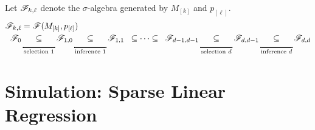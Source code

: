 \documentclass{article}
\begin{document}
Let $\mathscr{F}_{k,\ell}$ denote the $\sigma$-algebra generated by $M_{[k]}$ and $p_{[\ell]}$.
\begin{align*}
  \sF_{k,\ell} &= \sF(M_{[k]},p_{[\ell]})\\
  \sF_0 &\underlabel_{\text{selection } 1} \sF_{1,0} \underlabel_{\text{inference } 1}
  \sF_{1,1} \;\;\sub \cdots \sub\;\;
  \sF_{d-1,d-1} \underlabel_{\text{selection } d} \sF_{d,d-1}
  \underlabel_{\text{inference } d} \sF_{d,d}
\end{align*}


\section{Simulation: Sparse Linear Regression}






\end{document}
